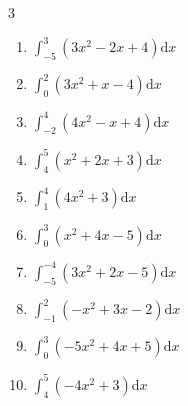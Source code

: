 \begin{multicols}{3}
\begin{enumerate}

  \item $\displaystyle \int_{-5}^{3}\left( 3x^{2}-2x+4 \right) \mathrm{d}x$


  \item $\displaystyle \int_{0}^{2}\left( 3x^{2}+x-4 \right) \mathrm{d}x$


  \item $\displaystyle \int_{-2}^{4}\left( 4x^{2}-x+4 \right) \mathrm{d}x$

        \phantom{$\displaystyle =94$}

\columnbreak %

  \item $\displaystyle \int_{4}^{5}\left( x^{2}+2x+3 \right) \mathrm{d}x$


  \item $\displaystyle \int_{1}^{4}\left( 4x^{2}+3 \right) \mathrm{d}x$


  \item $\displaystyle \int_{0}^{3}\left( x^{2}+4x-5 \right) \mathrm{d}x$


  \item $\displaystyle \int_{-5}^{-4}\left( 3x^{2}+2x-5 \right) \mathrm{d}x$


  \item $\displaystyle \int_{-1}^{2}\left( -x^{2}+3x-2 \right) \mathrm{d}x$


\columnbreak %

  \item $\displaystyle \int_{0}^{3}\left( -5x^{2}+4x+5 \right) \mathrm{d}x$


  \item $\displaystyle \int_{4}^{5}\left( -4x^{2}+3 \right) \mathrm{d}x$



\end{enumerate}
\end{multicols}
